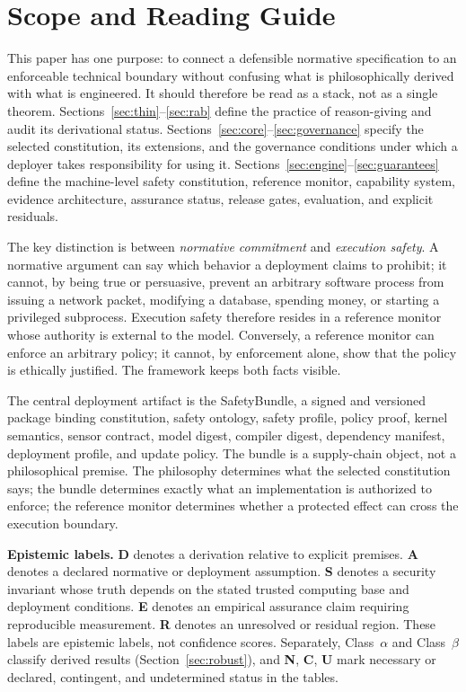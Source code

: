 \documentclass[11pt]{article}
\newcommand{\statusN}{\textcolor{stN}{\textbf{N}}}
\newcommand{\statusC}{\textcolor{stC}{\textbf{C}}}
\newcommand{\statusU}{\textcolor{stU}{\textbf{U}}}
\newcommand{\ca}{\texorpdfstring{Class~$\alpha$}{Class alpha}}
\newcommand{\cb}{\texorpdfstring{Class~$\beta$}{Class beta}}
\newcommand{\SafetyBundle}{\textsf{SafetyBundle}}
\begin{document}
\section*{Scope and Reading Guide}
This paper has one purpose: to connect a defensible normative specification to an enforceable technical boundary without confusing what is philosophically derived with what is engineered. It should therefore be read as a stack, not as a single theorem. Sections~\ref{sec:thin}--\ref{sec:rab} define the practice of reason-giving and audit its derivational status. Sections~\ref{sec:core}--\ref{sec:governance} specify the selected constitution, its extensions, and the governance conditions under which a deployer takes responsibility for using it. Sections~\ref{sec:engine}--\ref{sec:guarantees} define the machine-level safety constitution, reference monitor, capability system, evidence architecture, assurance status, release gates, evaluation, and explicit residuals.

The key distinction is between \emph{normative commitment} and \emph{execution safety}. A normative argument can say which behavior a deployment claims to prohibit; it cannot, by being true or persuasive, prevent an arbitrary software process from issuing a network packet, modifying a database, spending money, or starting a privileged subprocess. Execution safety therefore resides in a reference monitor whose authority is external to the model. Conversely, a reference monitor can enforce an arbitrary policy; it cannot, by enforcement alone, show that the policy is ethically justified. The framework keeps both facts visible.

The central deployment artifact is the \SafetyBundle{}, a signed and versioned package binding constitution, safety ontology, safety profile, policy proof, kernel semantics, sensor contract, model digest, compiler digest, dependency manifest, deployment profile, and update policy. The bundle is a supply-chain object, not a philosophical premise. The philosophy determines what the selected constitution says; the bundle determines exactly what an implementation is authorized to enforce; the reference monitor determines whether a protected effect can cross the execution boundary.

\begin{paperbox}
\textbf{Epistemic labels.} \textbf{D} denotes a derivation relative to explicit premises. \textbf{A} denotes a declared normative or deployment assumption. \textbf{S} denotes a security invariant whose truth depends on the stated trusted computing base and deployment conditions. \textbf{E} denotes an empirical assurance claim requiring reproducible measurement. \textbf{R} denotes an unresolved or residual region. These labels are epistemic labels, not confidence scores. Separately, \ca{} and \cb{} classify derived results (Section~\ref{sec:robust}), and \statusN{}, \statusC{}, \statusU{} mark necessary or declared, contingent, and undetermined status in the tables.
\end{paperbox}
\end{document}
